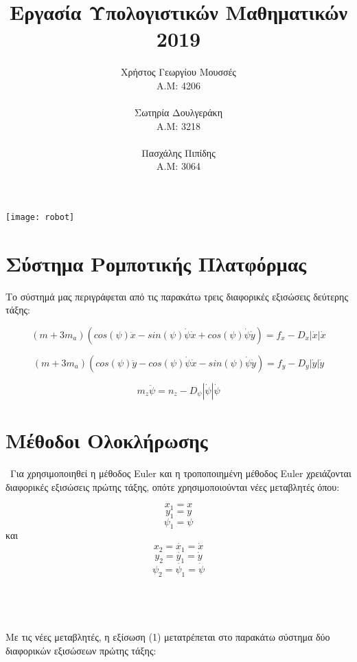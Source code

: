 \documentclass{article}
\begin{document}
 
\title{Εργασία Υπολογιστικών Μαθηματικών 2019}
\author{
Χρήστος Γεωργίου Μουσσές\\A.M: 4206\\\\
Σωτηρία Δουλγεράκη\\A.M: 3218\\\\
Πασχάλης Πιπίδης\\A.M: 3064
}
\date{}

\maketitle
\texttt{[image: robot]}

\newpage
\tableofcontents
\newpage


\section{Σύστημα Ρομποτικής Πλατφόρμας}

Το σύστημά μας περιγράφεται από τις παρακάτω τρεις διαφορικές εξισώσεις δεύτερης τάξης: 

\begin{equation}
(m + 3m_a)(cos(\psi)\ddot{x} - sin(\psi)\dot{\psi}\dot{x} + cos(\psi)\dot{\psi}\dot{y}) = f_x - D_x|\dot{x}|\dot{x}
\end{equation}

\begin{equation}
(m + 3m_a)(cos(\psi)\ddot{y} - cos(\psi)\dot{\psi}\dot{x} - sin(\psi)\dot{\psi}\dot{y}) = f_y - D_y|\dot{y}|\dot{y}
\end{equation}

\begin{equation}
m_z\ddot{\psi} = n_z - D_\psi|\dot{\psi}|\dot{\psi}
\end{equation}

\section{Μέθοδοι Ολοκλήρωσης}\
Για χρησιμοποιηθεί η μέθοδος Euler και η τροποποιημένη μέθοδος Euler χρειάζονται διαφορικές εξισώσεις πρώτης τάξης, οπότε χρησιμοποιούνται νέες μεταβλητές όπου:

\[
x_1 = x
\]
\[
y_1 = y
\]
\[
\psi_1 = \psi
\]
και
\[
x_2 = \dot{x_1} = \dot{x} 
\]
\[
y_2 = \dot{y_1} = \dot{y} 
\]
\[
\psi_2 = \dot{\psi_1} = \dot{\psi} 
\]
\\\\\\\\
Με τις νέες μεταβλητές, η εξίσωση (1) μετατρέπεται στο παρακάτω σύστημα δύο διαφορικών εξισώσεων πρώτης τάξης:
\end{document}
